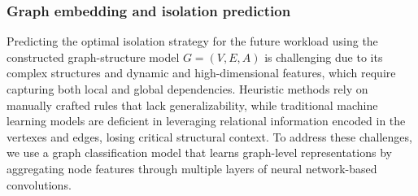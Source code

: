 
\subsubsection{Graph embedding and isolation prediction} %


Predicting the optimal isolation strategy for the future workload using the constructed graph-structure model $G=(V, E, A)$ is challenging due to its complex structures and dynamic and high-dimensional features, which require capturing both local and global dependencies. Heuristic methods rely on manually crafted rules that lack generalizability, while traditional machine learning models are deficient in leveraging relational information encoded in the vertexes and edges, losing critical structural context. To address these challenges, we use a graph classification model that learns graph-level representations by aggregating node features through multiple layers of neural network-based convolutions.


